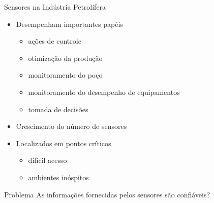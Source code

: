 \documentclass{beamer}
\begin{document}
\begin{frame}{Sensores na Indústria Petrolífera}
    \begin{itemize}
        \item Desempenham importantes papéis
            \begin{itemize}
                \item ações de controle
                \item otimização da produção
                \item monitoramento do poço
                \item monitoramento do desempenho de equipamentos
                \item tomada de decisões
            \end{itemize}
        \item Crescimento do número de sensores
        \item Localizados em pontos críticos
            \begin{itemize}
                \item difícil acesso
                \item ambientes inóspitos
            \end{itemize}
    \end{itemize}

    \begin{block}{Problema}
        As informações fornecidas pelos sensores são \alert{confiáveis}?
    \end{block}

\end{frame}
\end{document}
